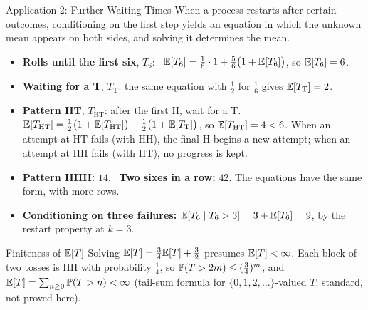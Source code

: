 \begin{frame}{Application 2: Further Waiting Times}
  \small
  When a process restarts after certain outcomes, conditioning on the first step yields an equation in which the unknown mean appears on both sides, and solving it determines the mean.
  \begin{itemize}
    \item \textbf{Rolls until the first six}, $T_6$: \ $\mathbb{E}[T_6]=\tfrac16\cdot1+\tfrac56\big(1+\mathbb{E}[T_6]\big)$, so $\mathbb{E}[T_6]=6$.
    \item \textbf{Waiting for a T}, $T_{\mathrm T}$: the same equation with $\tfrac12$ for $\tfrac16$ gives $\mathbb{E}[T_{\mathrm T}]=2$.
    \item \textbf{Pattern HT}, $T_{\mathrm{HT}}$: after the first H, wait for a T. \ $\mathbb{E}[T_{\mathrm{HT}}]=\tfrac12\big(1+\mathbb{E}[T_{\mathrm{HT}}]\big)+\tfrac12\big(1+\mathbb{E}[T_{\mathrm T}]\big)$, so $\mathbb{E}[T_{\mathrm{HT}}]=4<6$. When an attempt at HT fails (with HH), the final H begins a new attempt; when an attempt at HH fails (with HT), no progress is kept.
    \item \textbf{Pattern HHH:} $14$. \ \textbf{Two sixes in a row:} $42$. The equations have the same form, with more rows.
    \item \textbf{Conditioning on three failures:} $\mathbb{E}[T_6\mid T_6>3]=3+\mathbb{E}[T_6]=9$, by the restart property at $k=3$.
  \end{itemize}
  \begin{block}{Finiteness of $\mathbb{E}[T]$}
    Solving $\mathbb{E}[T]=\tfrac34\mathbb{E}[T]+\tfrac32$ presumes $\mathbb{E}[T]<\infty$. Each block of two tosses is HH with probability $\tfrac14$, so $\mathbb{P}(T>2m)\le(\tfrac34)^m$, and $\mathbb{E}[T]=\sum_{n\ge0}\mathbb{P}(T>n)<\infty$ (tail-sum formula for $\{0,1,2,\dots\}$-valued $T$; standard, not proved here).
  \end{block}
\end{frame}

